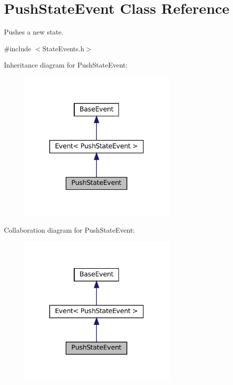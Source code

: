 \hypertarget{classPushStateEvent}{}\section{Push\+State\+Event Class Reference}
\label{classPushStateEvent}


Pushes a new state.  




{\ttfamily \#include $<$State\+Events.\+h$>$}



Inheritance diagram for Push\+State\+Event\+:\nopagebreak
\begin{figure}[H]
\begin{center}
\leavevmode
\includegraphics[width=223pt]{classPushStateEvent__inherit__graph}
\end{center}
\end{figure}


Collaboration diagram for Push\+State\+Event\+:\nopagebreak
\begin{figure}[H]
\begin{center}
\leavevmode
\includegraphics[width=223pt]{classPushStateEvent__coll__graph}
\end{center}
\end{figure}
